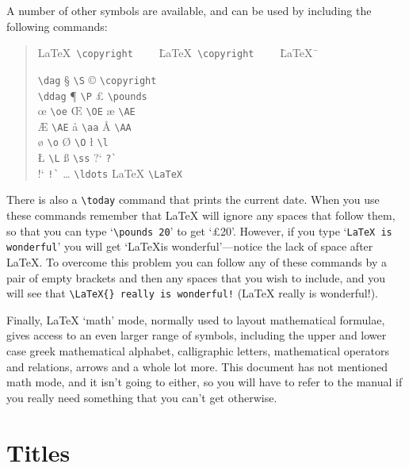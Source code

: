 A number of other symbols are available, and can be used by including the
following commands:
\begin{quote}\begin{tabbing}

\LaTeX~\= \verb|\copyright|~~~~ \= \LaTeX~\= \verb|\copyright|~~~~ \=
\LaTeX~\=  \kill

\dag       \> \verb|\dag|       \> \S     \> \verb|\S|     \>
\copyright \> \verb|\copyright| \\
\ddag      \> \verb|\ddag|      \> \P     \> \verb|\P|     \>
\pounds    \> \verb|\pounds|    \\
\oe        \> \verb|\oe|        \> \OE    \> \verb|\OE|    \>
\ae        \> \verb|\AE|        \\
\AE        \> \verb|\AE|        \> \aa    \> \verb|\aa|    \>
\AA        \> \verb|\AA|        \\
\o         \> \verb|\o|         \> \O     \> \verb|\O|     \>
\l         \> \verb|\l|         \\
\L         \> \verb|\L|         \> \ss    \> \verb|\ss|    \>
?`         \> \verb|?`|         \\
!`         \> \verb|!`|         \> \ldots \> \verb|\ldots| \>
\LaTeX     \> \verb|\LaTeX|     \\
\end{tabbing}\end{quote}
There is also a \verb|\today| command that prints the current date. When you
use these commands remember that \LaTeX{} will ignore any spaces that
follow them, so that you can type `\verb|\pounds 20|' to get `\pounds 20'.
However, if you type `\verb|LaTeX is wonderful|' you will get `\LaTeX is
wonderful'---notice the lack of space after \LaTeX.
To overcome this problem you can follow any of these commands by a
pair of empty brackets and then any spaces that you wish to include,
and you will see that
\verb|\LaTeX{} really is wonderful!| (\LaTeX{} really is wonderful!).

Finally, \LaTeX{} `math' mode, normally used to layout mathematical
formulae, gives access to an even larger range of symbols, including the
upper and lower case greek mathematical alphabet, calligraphic letters,
mathematical operators and relations, arrows and a whole lot more.  This
document has not mentioned math mode, and it isn't going to either, so you
will have to refer to the manual if you really need something that you
can't get otherwise.

\section{Titles}\label{sec:title}

